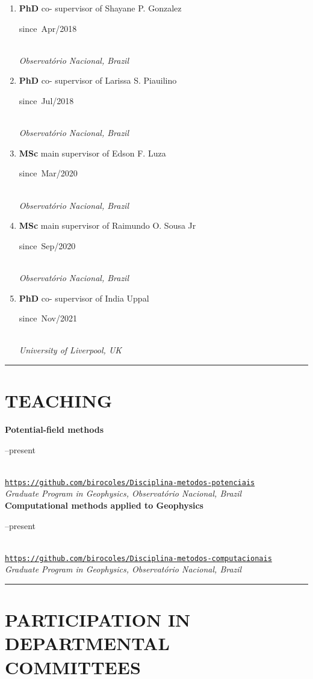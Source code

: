 \documentclass[11pt,a4paper,onecolumn]{article}
\newcommand{\Student}[5]{
	\noindent \textbf{#1} #2 supervisor of #3 \hfill 
	\parbox{0.1\textwidth}{\raggedleft since~#4} \\
	\noindent\textsl{#5}}
\begin{document}
\begin{enumerate}[leftmargin=*, label=\textbf{(\arabic*)}]
	
	\item\Student{PhD}{co-}{Shayane P. Gonzalez}{Apr/2018}{Observat{\'o}rio Nacional, Brazil}

	\item\Student{PhD}{co-}{Larissa S. Piauilino}{Jul/2018}{Observat{\'o}rio Nacional, Brazil}

	\item\Student{MSc}{main}{Edson F. Luza}{Mar/2020}{Observat{\'o}rio Nacional, Brazil}	
	
	\item\Student{MSc}{main}{Raimundo O. Sousa Jr}{Sep/2020}{Observat{\'o}rio Nacional, Brazil}
	
	\item\Student{PhD}{co-}{India Uppal}{Nov/2021}{University of Liverpool, UK}

	
\end{enumerate}

\bigskip \hrule

\section*{TEACHING}{}

\noindent \textbf{Potential-field methods} \hfill 
\parbox{0.1\textwidth}{--present} \\
\noindent\href{https://github.com/birocoles/Disciplina-metodos-potenciais}
{\texttt{https://github.com/birocoles/Disciplina-metodos-potenciais}} \\
\noindent\textsl{Graduate Program in Geophysics, Observat\'{o}rio Nacional, Brazil} \vspace{0.5\baselineskip} \\
\noindent \textbf{Computational methods applied to Geophysics} \hfill
\parbox{0.1\textwidth}{--present} \\
\noindent\href{https://github.com/birocoles/Disciplina-metodos-computacionais}
{\texttt{https://github.com/birocoles/Disciplina-metodos-computacionais}} \\
\noindent\textsl{Graduate Program in Geophysics, Observat\'{o}rio Nacional, Brazil} \\

\bigskip \hrule

\section*{PARTICIPATION IN DEPARTMENTAL COMMITTEES}{}
\end{document}
